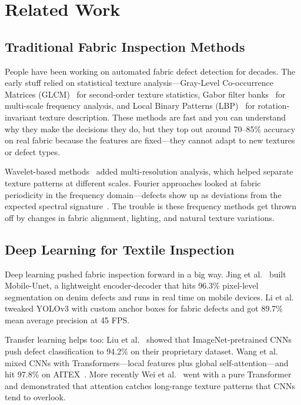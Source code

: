 \documentclass[journal]{IEEEtran}
\begin{document}
\section{Related Work}
\label{sec:related}

\subsection{Traditional Fabric Inspection Methods}

People have been working on automated fabric defect detection for decades. The early stuff relied on statistical texture analysis---Gray-Level Co-occurrence Matrices (GLCM)~\cite{haralick1973textural} for second-order texture statistics, Gabor filter banks~\cite{bodnarova2000textile} for multi-scale frequency analysis, and Local Binary Patterns (LBP)~\cite{ojala2002multiresolution} for rotation-invariant texture description. These methods are fast and you can understand why they make the decisions they do, but they top out around 70--85\% accuracy on real fabric because the features are fixed---they cannot adapt to new textures or defect types.

Wavelet-based methods~\cite{jasper1996textile} added multi-resolution analysis, which helped separate texture patterns at different scales. Fourier approaches looked at fabric periodicity in the frequency domain---defects show up as deviations from the expected spectral signature~\cite{chan2000fabric}. The trouble is these frequency methods get thrown off by changes in fabric alignment, lighting, and natural texture variations.

\subsection{Deep Learning for Textile Inspection}

Deep learning pushed fabric inspection forward in a big way. Jing et al.~\cite{jing2022mobile} built Mobile-Unet, a lightweight encoder-decoder that hits 96.3\% pixel-level segmentation on denim defects and runs in real time on mobile devices. Li et al.~\cite{li2020yolo} tweaked YOLOv3 with custom anchor boxes for fabric defects and got 89.7\% mean average precision at 45 FPS.

Transfer learning helps too: Liu et al.~\cite{liu2019fabric} showed that ImageNet-pretrained CNNs push defect classification to 94.2\% on their proprietary dataset. Wang et al.~\cite{wang2024transformer} mixed CNNs with Transformers---local features plus global self-attention---and hit 97.8\% on AITEX~\cite{silva2020aitex}. More recently Wei et al.~\cite{wei2023transformer} went with a pure Transformer and demonstrated that attention catches long-range texture patterns that CNNs tend to overlook.
\end{document}
